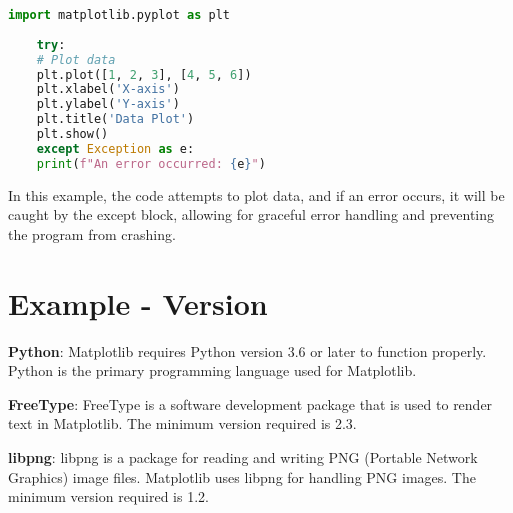 \begin{lstlisting}[language=Python, caption={Matplotlib error handling}]
	import matplotlib.pyplot as plt
	
	try:
	# Plot data
	plt.plot([1, 2, 3], [4, 5, 6])
	plt.xlabel('X-axis')
	plt.ylabel('Y-axis')
	plt.title('Data Plot')
	plt.show()
	except Exception as e:
	print(f"An error occurred: {e}")
\end{lstlisting}

In this example, the code attempts to plot data, and if an error occurs, it will be caught by the except block, allowing for graceful error handling and preventing the program from crashing.




\section{Example - Version}

\begin{table}[h]
	\centering
	\caption{Python package Dependencies}
	\label{tab:dependencies}
\end{table}

\textbf{Python}: Matplotlib requires Python version 3.6 or later to function properly. Python is the primary programming language used for Matplotlib.

\textbf{FreeType}: FreeType is a software development package that is used to render text in Matplotlib. The minimum version required is 2.3.

\textbf{libpng}: libpng is a package for reading and writing PNG (Portable Network Graphics) image files. Matplotlib uses libpng for handling PNG images. The minimum version required is 1.2.

